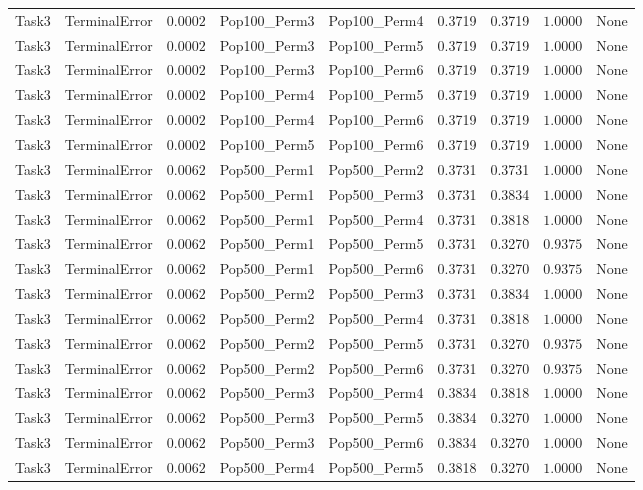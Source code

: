\documentclass[8pt]{article}
\begin{document}
\begin{longtable}{llccccccc}
Task3 & TerminalError & $0.0002$ & Pop100\_Perm3 & Pop100\_Perm4 & 0.3719 & 0.3719 & $1.0000$ & None \\
Task3 & TerminalError & $0.0002$ & Pop100\_Perm3 & Pop100\_Perm5 & 0.3719 & 0.3719 & $1.0000$ & None \\
Task3 & TerminalError & $0.0002$ & Pop100\_Perm3 & Pop100\_Perm6 & 0.3719 & 0.3719 & $1.0000$ & None \\
Task3 & TerminalError & $0.0002$ & Pop100\_Perm4 & Pop100\_Perm5 & 0.3719 & 0.3719 & $1.0000$ & None \\
Task3 & TerminalError & $0.0002$ & Pop100\_Perm4 & Pop100\_Perm6 & 0.3719 & 0.3719 & $1.0000$ & None \\
Task3 & TerminalError & $0.0002$ & Pop100\_Perm5 & Pop100\_Perm6 & 0.3719 & 0.3719 & $1.0000$ & None \\
Task3 & TerminalError & $0.0062$ & Pop500\_Perm1 & Pop500\_Perm2 & 0.3731 & 0.3731 & $1.0000$ & None \\
Task3 & TerminalError & $0.0062$ & Pop500\_Perm1 & Pop500\_Perm3 & 0.3731 & 0.3834 & $1.0000$ & None \\
Task3 & TerminalError & $0.0062$ & Pop500\_Perm1 & Pop500\_Perm4 & 0.3731 & 0.3818 & $1.0000$ & None \\
Task3 & TerminalError & $0.0062$ & Pop500\_Perm1 & Pop500\_Perm5 & 0.3731 & 0.3270 & $0.9375$ & None \\
Task3 & TerminalError & $0.0062$ & Pop500\_Perm1 & Pop500\_Perm6 & 0.3731 & 0.3270 & $0.9375$ & None \\
Task3 & TerminalError & $0.0062$ & Pop500\_Perm2 & Pop500\_Perm3 & 0.3731 & 0.3834 & $1.0000$ & None \\
Task3 & TerminalError & $0.0062$ & Pop500\_Perm2 & Pop500\_Perm4 & 0.3731 & 0.3818 & $1.0000$ & None \\
Task3 & TerminalError & $0.0062$ & Pop500\_Perm2 & Pop500\_Perm5 & 0.3731 & 0.3270 & $0.9375$ & None \\
Task3 & TerminalError & $0.0062$ & Pop500\_Perm2 & Pop500\_Perm6 & 0.3731 & 0.3270 & $0.9375$ & None \\
Task3 & TerminalError & $0.0062$ & Pop500\_Perm3 & Pop500\_Perm4 & 0.3834 & 0.3818 & $1.0000$ & None \\
Task3 & TerminalError & $0.0062$ & Pop500\_Perm3 & Pop500\_Perm5 & 0.3834 & 0.3270 & $1.0000$ & None \\
Task3 & TerminalError & $0.0062$ & Pop500\_Perm3 & Pop500\_Perm6 & 0.3834 & 0.3270 & $1.0000$ & None \\
Task3 & TerminalError & $0.0062$ & Pop500\_Perm4 & Pop500\_Perm5 & 0.3818 & 0.3270 & $1.0000$ & None \\

\end{longtable}
\end{document}
